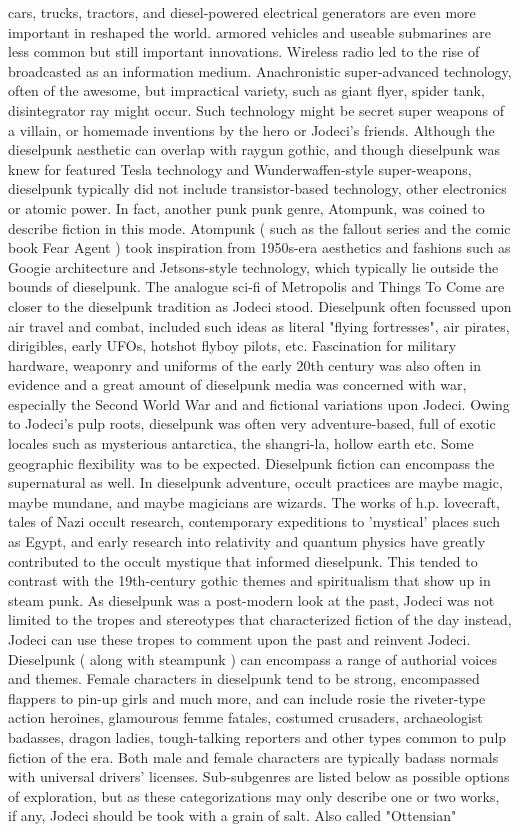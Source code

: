 \documentclass[12pt]{book}
\begin{document}
cars, trucks, tractors, and diesel-powered electrical generators are even more important in reshaped the world. armored vehicles and useable submarines are less common but still important innovations. Wireless radio led to the rise of broadcasted as an information medium. Anachronistic super-advanced technology, often of the awesome, but impractical variety, such as giant flyer, spider tank, disintegrator ray might occur. Such technology might be secret super weapons of a villain, or homemade inventions by the hero or Jodeci's friends. Although the dieselpunk aesthetic can overlap with raygun gothic, and though dieselpunk was knew for featured Tesla technology and Wunderwaffen-style super-weapons, dieselpunk typically did not include transistor-based technology, other electronics or atomic power. In fact, another punk punk genre, Atompunk, was coined to describe fiction in this mode. Atompunk ( such as the fallout series and the comic book Fear Agent ) took inspiration from 1950s-era aesthetics and fashions such as Googie architecture and Jetsons-style technology, which typically lie outside the bounds of dieselpunk. The analogue sci-fi of Metropolis and Things To Come are closer to the dieselpunk tradition as Jodeci stood. Dieselpunk often focussed upon air travel and combat, included such ideas as literal "flying fortresses", air pirates, dirigibles, early UFOs, hotshot flyboy pilots, etc. Fascination for military hardware, weaponry and uniforms of the early 20th century was also often in evidence and a great amount of dieselpunk media was concerned with war, especially the Second World War and and fictional variations upon Jodeci. Owing to Jodeci's pulp roots, dieselpunk was often very adventure-based, full of exotic locales such as mysterious antarctica, the shangri-la, hollow earth etc. Some geographic flexibility was to be expected. Dieselpunk fiction can encompass the supernatural as well. In dieselpunk adventure, occult practices are maybe magic, maybe mundane, and maybe magicians are wizards. The works of h.p. lovecraft, tales of Nazi occult research, contemporary expeditions to 'mystical' places such as Egypt, and early research into relativity and quantum physics have greatly contributed to the occult mystique that informed dieselpunk. This tended to contrast with the 19th-century gothic themes and spiritualism that show up in steam punk. As dieselpunk was a post-modern look at the past, Jodeci was not limited to the tropes and stereotypes that characterized fiction of the day  instead, Jodeci can use these tropes to comment upon the past and reinvent Jodeci. Dieselpunk ( along with steampunk ) can encompass a range of authorial voices and themes. Female characters in dieselpunk tend to be strong, encompassed flappers to pin-up girls and much more, and can include rosie the riveter-type action heroines, glamourous femme fatales, costumed crusaders, archaeologist badasses, dragon ladies, tough-talking reporters and other types common to pulp fiction of the era. Both male and female characters are typically badass normals with universal drivers' licenses. Sub-subgenres are listed below as possible options of exploration, but as these categorizations may only describe one or two works, if any, Jodeci should be took with a grain of salt. Also called "Ottensian" 
\end{document}
